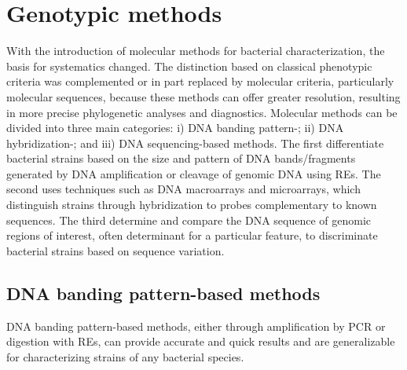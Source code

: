 \begin{figure}[!ht]
    \label{fig:introduction_figure3}
\end{figure}

\section{Genotypic methods}

With the introduction of molecular methods for bacterial characterization, the basis for systematics changed. The distinction based on classical phenotypic criteria was complemented or in part replaced by molecular criteria, particularly molecular sequences, because these methods can offer greater resolution, resulting in more precise phylogenetic analyses and diagnostics. Molecular methods can be divided into three main categories: i) \ac{DNA} banding pattern-; ii) \ac{DNA} hybridization-; and iii) \ac{DNA} sequencing-based methods. The first differentiate bacterial strains based on the size and pattern of \ac{DNA} bands/fragments generated by \ac{DNA} amplification or cleavage of genomic \ac{DNA} using \ac{REs}. The second uses techniques such as \ac{DNA} macroarrays and microarrays, which distinguish strains through hybridization to probes complementary to known sequences. The third determine and compare the \ac{DNA} sequence of genomic regions of interest, often determinant for a particular feature, to discriminate bacterial strains based on sequence variation.

\subsection{DNA banding pattern-based methods}

\ac{DNA} banding pattern-based methods, either through amplification by \ac{PCR} or digestion with \ac{REs}, can provide accurate and quick results and are generalizable for characterizing strains of any bacterial species.

